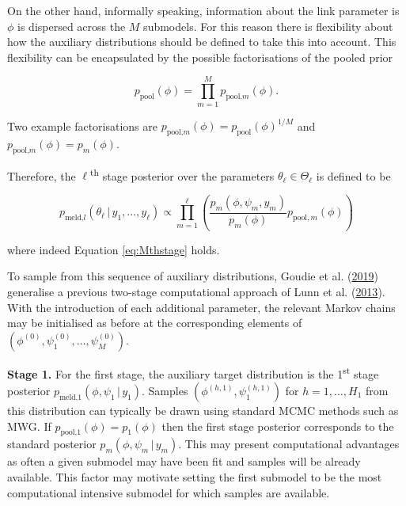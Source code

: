 \documentclass[11pt,]{book}
\begin{document}
On the other hand, informally speaking, information about the link
parameter is \(\phi\) is dispersed across the \(M\) submodels. For this
reason there is flexibility about how the auxiliary distributions should
be defined to take this into account. This flexibility can be
encapsulated by the possible factorisations of the pooled prior

\begin{equation}
p_{\text{pool}}(\phi) = \prod_{m=1}^{M} p_{\text{pool,}m}(\phi). \label{eq:factorpp}
\end{equation}

Two example factorisations are
\(p_{\text{pool,}m}(\phi) = p_{\text{pool}}(\phi)^{1/M}\) and
\(p_{\text{pool,}m}(\phi) = p_m(\phi)\).

Therefore, the \(\ell\)\textsuperscript{th} stage posterior over the
parameters \(\theta_\ell \in \Theta_\ell\) is defined to be

\begin{equation}
p_{\text{meld,}l}(\theta_\ell \, | \, y_1, \ldots, y_\ell) \propto \prod_{m=1}^\ell\left(\frac{p_m(\phi, \psi_m, y_m)}{p_m(\phi)} p_{\mathrm{pool}, m}(\phi)\right)
\end{equation}

where indeed Equation \eqref{eq:Mthstage} holds.

To sample from this sequence of auxiliary distributions, Goudie et al.
(\protect\hyperlink{ref-goudie2019joining}{2019}) generalise a previous
two-stage computational approach of Lunn et al.
(\protect\hyperlink{ref-lunn2013fully}{2013}). With the introduction of
each additional parameter, the relevant Markov chains may be initialised
as before at the corresponding elements of
\((\phi^{(0)}, \psi_1^{(0)}, \ldots, \psi_M^{(0)})\).

\textbf{Stage 1.} For the first stage, the auxiliary target distribution
is the 1\textsuperscript{st} stage posterior
\(p_{\text {meld,}1}(\phi, \psi_{1} \, | \, y_{1})\). Samples
\((\phi^{(h, 1)}, \psi_1^{(h, 1)})\) for \(h=1, \ldots, H_1\) from this
distribution can typically be drawn using standard MCMC methods such as
MWG. If \(p_{\text{pool,}1}(\phi) = p_1(\phi)\) then the first stage
posterior corresponds to the standard posterior
\(p_m(\phi, \psi_m \, | \, y_m)\). This may present computational
advantages as often a given submodel may have been fit and samples will
be already available. This factor may motivate setting the first
submodel to be the most computational intensive submodel for which
samples are available.
\end{document}
